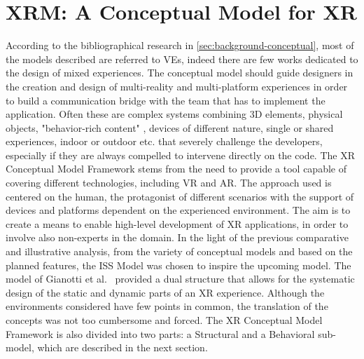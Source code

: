 \chapter{XRM: A Conceptual Model for XR}
\label{ch:conceptual-model}

According to the bibliographical research in \autoref{sec:background-conceptual}, most of the models described are referred to VEs, indeed there are few works dedicated to the design of mixed experiences. The conceptual model should guide designers in the creation and design of multi-reality and multi-platform experiences in order to build a communication bridge with the team that has to implement the application. Often these are complex systems combining 3D elements, physical objects, "behavior-rich content" \cite{walczak_structured_2008}, devices of different nature, single or shared experiences, indoor or outdoor etc. that severely challenge the developers, especially if they are always compelled to intervene directly on the code. The XR Conceptual Model Framework stems from the need to provide a tool capable of covering different technologies, including VR and AR. The approach used is centered on the human, the protagonist of different scenarios with the support of devices and platforms dependent on the experienced environment. The aim is to create a means to enable high-level development of XR applications, in order to involve also non-experts in the domain. 
In the light of the previous comparative and illustrative analysis, from the variety of conceptual models and based on the planned features, the ISS Model was chosen to inspire the upcoming model. The model of Gianotti et al.~\cite{dobbie_modeling_2020} provided a dual structure that allows for the systematic design of the static and dynamic parts of an XR experience. Although the environments considered have few points in common, the translation of the concepts was not too cumbersome and forced. The XR Conceptual Model Framework is also divided into two parts: a Structural and a Behavioral sub-model, which are described in the next section. 




